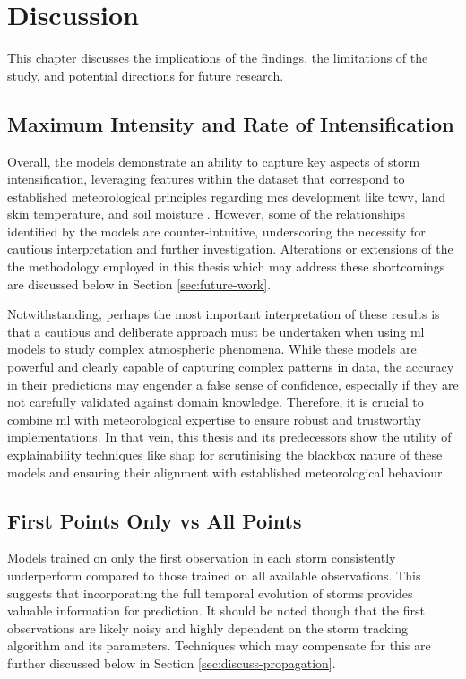 \chapter{Discussion}
\label{ch:discuss}

This chapter discusses the implications of the findings, the limitations of the study, and potential directions for future research.

\section{Maximum Intensity and Rate of Intensification}

Overall, the models demonstrate an ability to capture key aspects of storm intensification, leveraging features within the dataset that correspond to established meteorological principles regarding \acrshort{mcs} development like \acrfull{tcwv}, land skin temperature, and soil moisture \citep{Li2023,Taylor2017,Klein2020}. However, some of the relationships identified by the models are counter-intuitive, underscoring the necessity for cautious interpretation and further investigation. Alterations or extensions of the the methodology employed in this thesis which may address these shortcomings are discussed below in Section \ref{sec:future-work}.

Notwithstanding, perhaps the most important interpretation of these results is that a cautious and deliberate approach must be undertaken when using \acrshort{ml} models to study complex atmospheric phenomena. While these models are powerful and clearly capable of capturing complex patterns in data, the accuracy in their predictions may engender a false sense of confidence, especially if they are not carefully validated against domain knowledge. Therefore, it is crucial to combine \acrshort{ml} with meteorological expertise to ensure robust and trustworthy implementations. In that vein, this thesis and its predecessors show the utility of explainability techniques like \acrshort{shap} for scrutinising the \gls{blackbox} nature of these models and ensuring their alignment with established meteorological behaviour.

\section{First Points Only vs All Points}

Models trained on only the first observation in each storm consistently underperform compared to those trained on all available observations. This suggests that incorporating the full temporal evolution of storms provides valuable information for prediction. It should be noted though that the first observations are likely noisy and highly dependent on the storm tracking algorithm and its parameters. Techniques which may compensate for this are further discussed below in Section \ref{sec:discuss-propagation}.

